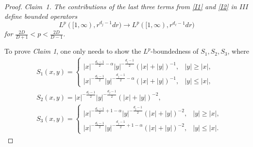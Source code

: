 \documentclass[12pt]{amsart}
\begin{document}
\begin{proof}
\textit{Claim~1. The contributions of the last three terms from \eqref{I1} and \eqref{I2} in $III$ define bounded operators
$$L^p([1,\infty),r^{d_j-1}dr) \to L^p([1,\infty),r^{d_\ell-1}dr) $$
for $\frac{2D}{D+1}<p<\frac{2D}{D-1}$.}

To prove \textit{Claim 1}, one only needs to show the $L^p$-boundedness of $S_1, S_2, S_3$, where
\begin{align*}
    &S_1(x,y) = \begin{cases}
        |x|^{-\frac{d_\ell-1}{2}-\alpha}|y|^{-\frac{d_j-1}{2}}(|x|+|y|)^{-1}, & |y|\ge |x|,\\
        |x|^{-\frac{d_\ell-1}{2}} |y|^{-\frac{d_j-1}{2}-\alpha} (|x|+|y|)^{-1}, & |y|\le |x|,
    \end{cases}  \\
    &S_2(x,y) = |x|^{-\frac{d_\ell-1}{2}}|y|^{-\frac{d_j-1}{2}} (|x|+|y|)^{-2},\\
    &S_3(x,y) = \begin{cases}
        |x|^{-\frac{d_\ell-1}{2}+1-\alpha}  |y|^{-\frac{d_j-1}{2} }(|x|+|y|)^{-2}, & |y|\ge |x|,\\
         |x|^{-\frac{d_\ell-1}{2}} |y|^{-\frac{d_j-1}{2} +1-\alpha }(|x|+|y|)^{-2}, & |y|\le |x|.
    \end{cases}
\end{align*}


\end{proof}
\end{document}
